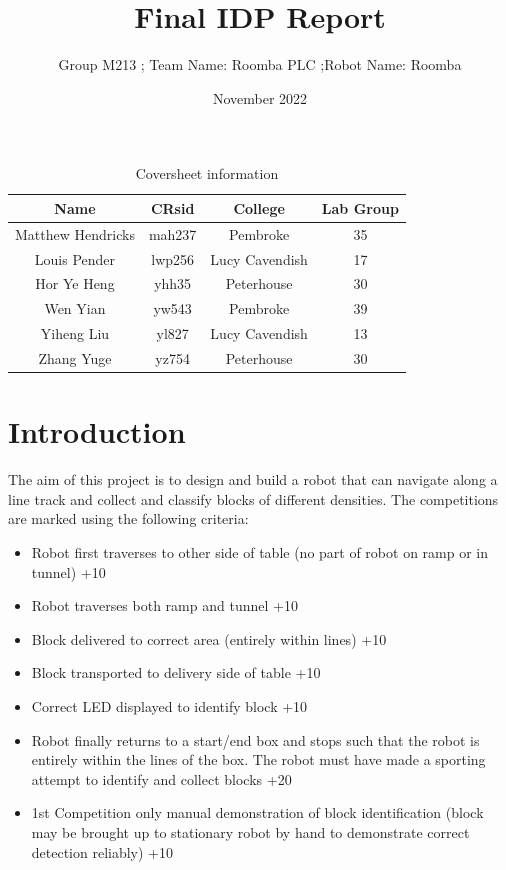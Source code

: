 \documentclass{article}
\title{Final IDP Report}
\author{Group M213 ; Team Name: Roomba PLC ;Robot Name: Roomba}
\date{November 2022}
\begin{document}
\maketitle


\begin{table}[]
    \centering
    \begin{tabular}{|c|c|c|c|}
        \hline
        Name &  CRsid & College & Lab Group \\
        \hline
        Matthew Hendricks & mah237 & Pembroke & 35 \\
        Louis Pender & lwp256 & Lucy Cavendish & 17 \\
        Hor Ye Heng & yhh35 & Peterhouse & 30 \\
        Wen Yian & yw543 & Pembroke & 39 \\
        Yiheng Liu & yl827 & Lucy Cavendish & 13 \\
        Zhang Yuge & yz754 & Peterhouse & 30 \\
        \hline
    \end{tabular}
    \caption{Coversheet information}
    \label{tab:Coversheet}
\end{table}


\newpage

\section{Introduction}
\quad The aim of this project is to design and build a robot that can navigate along a line track and collect and classify blocks of different densities. The competitions are marked using the following criteria:

\begin{itemize}
    \item Robot first traverses to other side of table (no part of robot on ramp or in tunnel) +10
    \item Robot traverses both ramp and tunnel +10
    \item Block delivered to correct area (entirely within lines) +10
    \item Block transported to delivery side of table +10
    \item Correct LED displayed to identify block +10
    \item Robot finally returns to a start/end box and stops such that the robot is entirely within the lines of the box. The robot must have made a sporting attempt to identify and collect blocks +20 
    \item 1st Competition only manual demonstration of block identification (block may be brought up to stationary robot by hand to demonstrate correct detection reliably) +10
\end{itemize}
\end{document}

